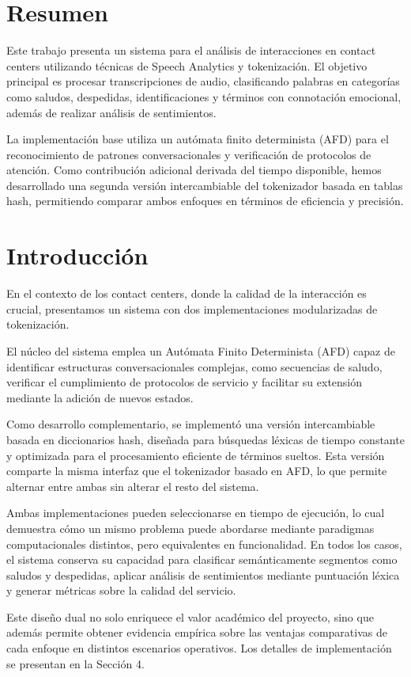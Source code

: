\section*{\centering Resumen}
Este trabajo presenta un sistema para el análisis de interacciones en contact centers
utilizando técnicas de Speech Analytics y tokenización. El objetivo principal es procesar
transcripciones de audio, clasificando palabras en categorías como saludos, despedidas,
identificaciones y términos con connotación emocional, además de realizar análisis de
sentimientos. 

La implementación base utiliza un autómata finito determinista (AFD) para el reconocimiento de
patrones conversacionales y verificación de protocolos de atención. Como contribución adicional
derivada del tiempo disponible, hemos desarrollado una segunda versión intercambiable del
tokenizador basada en tablas hash, permitiendo comparar ambos enfoques en términos de
eficiencia y precisión.

\section{Introducción}

En el contexto de los contact centers, donde la calidad de la interacción es crucial,
presentamos un sistema con dos implementaciones modularizadas de tokenización.

El núcleo del sistema emplea un Autómata Finito Determinista (AFD) capaz de identificar
estructuras conversacionales complejas, como secuencias de saludo, verificar el cumplimiento de
protocolos de servicio y facilitar su extensión mediante la adición de nuevos estados.

Como desarrollo complementario, se implementó una versión intercambiable basada en diccionarios
hash, diseñada para búsquedas léxicas de tiempo constante y optimizada para el procesamiento
eficiente de términos sueltos. Esta versión comparte la misma interfaz que el tokenizador
basado en AFD, lo que permite alternar entre ambas sin alterar el resto del sistema.

Ambas implementaciones pueden seleccionarse en tiempo de ejecución, lo cual demuestra cómo un
mismo problema puede abordarse mediante paradigmas computacionales distintos, pero equivalentes
en funcionalidad. En todos los casos, el sistema conserva su capacidad para clasificar
semánticamente segmentos como saludos y despedidas, aplicar análisis de sentimientos mediante
puntuación léxica y generar métricas sobre la calidad del servicio.

Este diseño dual no solo enriquece el valor académico del proyecto, sino que además permite
obtener evidencia empírica sobre las ventajas comparativas de cada enfoque en distintos
escenarios operativos. Los detalles de implementación se presentan en la Sección 4.

